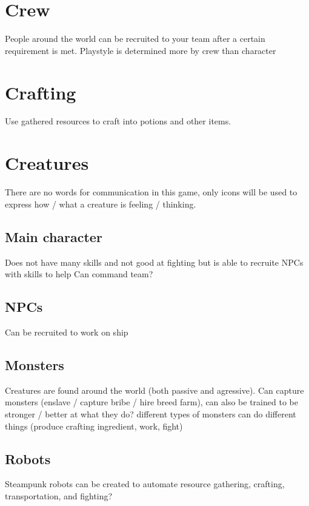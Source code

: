 \documentclass[a4paper]{scrreprt}
\begin{document}
\section{Crew}
People around the world can be recruited to your team after a certain requirement is met.
\newline Playstyle is determined more by crew than character


\section{Crafting}
Use gathered resources to craft into potions and other items.


\section{Creatures}
There are no words for communication in this game, only icons will be used to express how / what a creature is feeling / thinking.

\subsection{Main character}
Does not have many skills and not good at fighting but is able to recruite NPCs with skills to help
\newline Can command team?

\subsection{NPCs}
Can be recruited to work on ship

\subsection{Monsters}
Creatures are found around the world (both passive and agressive).
\newline Can capture monsters (enslave / capture bribe / hire breed farm), can also be trained to be stronger / better at what they do?
\newline different types of monsters can do different things (produce crafting ingredient, work, fight)

\subsection{Robots}
Steampunk robots can be created to automate resource gathering, crafting, transportation, and fighting?
\end{document}
